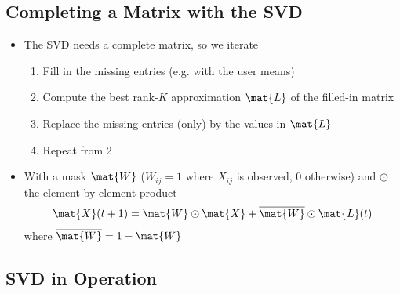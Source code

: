 \begin{slide}
\section[-1]{Completing a Matrix with the SVD}

\begin{PauseHighLight}
  \begin{itemize}
  \item The SVD needs a complete matrix, so we iterate\pause
    \begin{enumerate}
    \item Fill in the missing entries (e.g. with the user means)\pause
    \item Compute the best rank-$K$ approximation $\mat{L}$ of the
      filled-in matrix\pause
    \item Replace the missing entries (only) by the values in
      $\mat{L}$\pause
    \item Repeat from 2\pause
    \end{enumerate}
  \item With a mask $\mat{W}$ ($W_{ij}=1$ where $X_{ij}$ is observed,
    $0$ otherwise) and $\odot$ the element-by-element product
    \begin{align*}
      \mat{X}(t+1) = \mat{W}\odot\mat{X} + \overline{\mat{W}}\odot
      \mat{L}(t)
    \end{align*}
    where $\overline{\mat{W}} = 1 - \mat{W}$\pause
  \end{itemize}
\end{PauseHighLight}

\end{slide}


\begin{slide}
\section{SVD in Operation}
\pause
\pb
{}
\begin{center}
  \pause
\end{center}
\end{slide}


